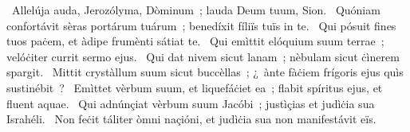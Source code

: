 {~Allelúja}
{%
auda, Jerozólyma, Dòminum~; lauda Deum tuum, Sion.
~Quóniam confortávit sèras portárum tuárum~; benedíxit fíliïs tuïs in te.
~Qui pósuit fines tuos paċem, et àdipe frumènti sátiat te.
~Qui emìttit elóquium suum terrae~; velóċiter currit sermo ejus.
~Qui dat nivem sicut lanam~; nèbulam sicut ċìnerem spargit.
~Mittit crystàllum suum sicut buccèllas~; ¿~ànte fàċiem frígoris ejus quìs sustinébit~?
~Emìttet vèrbum suum, et liquefáċiet ea~; flabit spíritus ejus, et fluent aquae.
~Qui adnúnçiat vèrbum suum Jacóbi~; justìçias et judìċia sua Israhéli.
~Non feċit táliter òmni naçióni, et judìċia sua non manifestávit eïs.}

